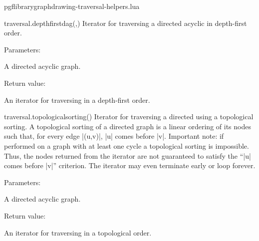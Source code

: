 
\begin{filedescription}{pgflibrarygraphdrawing-traversal-helpers.lua}


\begin{luacommand}{{traversal.depth\textunderscore{}first\textunderscore{}dag}(,)}
Iterator for traversing a directed acyclic  in depth-first order. 

Parameters:
\begin{parameterdescription}
	\item[\meta{graph}] A directed acyclic graph. 
\end{parameterdescription}


Return value:
\begin{parameterdescription} 
  \item[] An iterator for traversing  in a depth-first order. 
\end{parameterdescription}


\end{luacommand}
\begin{luacommand}{{traversal.topological\textunderscore{}sorting}()}
Iterator for traversing a directed  using a topological sorting.  A topological sorting of a directed graph is a linear ordering of its nodes such that, for every edge |(u,v)|, |u| comes before |v|.  Important note: if performed on a graph with at least one cycle a topological sorting is impossible. Thus, the nodes returned from the iterator are not guaranteed to satisfy the ``|u| comes before |v|'' criterion. The iterator may even terminate early or loop forever. 

Parameters:
\begin{parameterdescription}
	\item[\meta{graph}] A directed acyclic graph. 
\end{parameterdescription}


Return value:
\begin{parameterdescription} 
  \item[] An iterator for traversing  in a topological order. 
\end{parameterdescription}


\end{luacommand}

\end{filedescription}